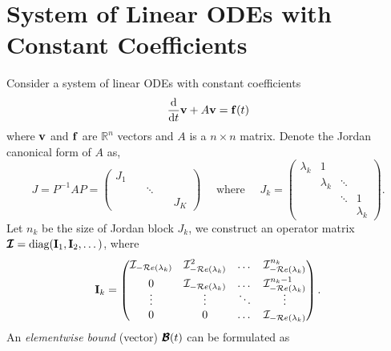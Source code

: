 \section{System of Linear ODEs with Constant Coefficients} \label{section:system-of-linear-odes-with-constant-coefficients}
    Consider a system of linear ODEs with constant coefficients 
    \begin{equation}\label{eq:linear-system-master}
        \frac{\mathrm{d}}{\mathrm{d}t}\mathbf{v} + A\mathbf{v} = \mathbf{f}(t)
    \end{equation}
    where $\mathbf{v}$ and $\mathbf{f}$ are $\mathbb{R}^n$ vectors and $A$ is a $n\times n$ matrix. Denote the Jordan canonical form of $A$ as,
    \begingroup 
    \setlength\arraycolsep{1pt}
    \begin{equation}\label{eq:jordan-definition}
        J = P^{-1}AP= \begin{pmatrix}
            J_1 \quad & & \\
            & \ddots & \\
            & & \quad J_K
        \end{pmatrix}
        {\quad \text{ where }\quad }
        J_k = \begin{pmatrix}
            \lambda_k & 1\\[-0.75em]
            & \lambda_k & \ddots\\[-0.75em]
            & & \ddots & 1\\[-0.25em]
            & & & \lambda_k
        \end{pmatrix}.
    \end{equation}
    \endgroup
    Let $n_k$ be the size of Jordan block $J_k$, we construct an operator matrix $\pmb{\mathcal{I}} = \text{diag}(\mathbf{I}_1, \mathbf{I}_2, \dots)$, where 
    \begingroup 
    \setlength\arraycolsep{1pt}
    \begin{equation}\label{eq:operator-block}
        \mathbf{I}_k = \begin{pmatrix}
            \mathcal{I}_{-\mathcal{R}e\left(\lambda_k\right)} & \mathcal{I}_{-\mathcal{R}e\left(\lambda_k\right)}^2 & \dots &\mathcal{I}_{-\mathcal{R}e\left(\lambda_k\right)}^{n_k} \\[1ex]
            0 & \mathcal{I}_{-\mathcal{R}e\left(\lambda_k\right)} & \dots &\mathcal{I}_{-\mathcal{R}e\left(\lambda_k\right)}^{n_k-1} \\[-1ex]
            \vdots & \vdots & \ddots & \vdots \\
            0 & 0 & \dots & \mathcal{I}_{-\mathcal{R}e\left(\lambda_k\right)}
        \end{pmatrix}.
    \end{equation}
    \endgroup
    An \textit{elementwise bound} (vector) $\pmb{\mathcal{B}}(t)$ can be formulated as 
